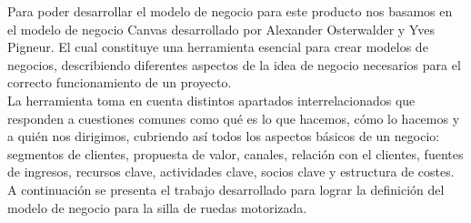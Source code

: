 Para poder desarrollar el modelo de negocio para este producto nos basamos en el modelo de negocio Canvas desarrollado por Alexander Osterwalder y Yves Pigneur. El cual constituye una herramienta esencial para crear modelos de negocios, describiendo diferentes aspectos de la idea de negocio necesarios para el correcto funcionamiento de un proyecto.\\

La herramienta toma en cuenta distintos apartados interrelacionados que responden a cuestiones comunes como qu\'e es lo que hacemos, c\'omo lo hacemos y a qui\'en nos dirigimos, cubriendo as\'i todos los aspectos b\'asicos de un negocio: segmentos de clientes, propuesta de valor, canales, relaci\'on con el clientes, fuentes de ingresos, recursos clave, actividades clave, socios clave y estructura de costes.\\

A continuaci\'on se presenta el trabajo desarrollado para lograr la definici\'on del modelo de negocio para la silla de ruedas motorizada.

